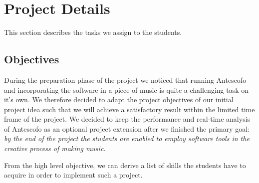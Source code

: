 \documentclass[onecolumn,nocopyrightspace,preprint]{sigplanconf}
\begin{document}
\section{Project Details}\label{sec:objectives}



This section describes the tasks we assign to the students.

\subsection{Objectives}

During the preparation phase of the project we noticed that running Antescofo
and incorporating the software in a piece of music is quite a challenging task
on it's own. We therefore decided to adapt the project objectives of our initial
project idea such that we will achieve a satisfactory result within the limited time
frame of the project. We decided to keep the performance and real-time analysis of
Antescofo as an optional project extension after we finished the primary goal:
\textit{by the end of the project the students are enabled to employ software
tools in the creative process of making music.}

From the high level objective, we can derive a list of skills the students
have to acquire in order to implement such a project.
\end{document}
